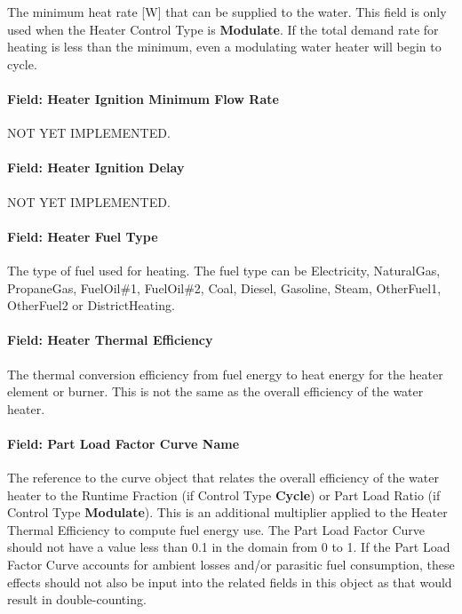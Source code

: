 The minimum heat rate {[}W{]} that can be supplied to the water. This field is only used when the Heater Control Type is \textbf{Modulate}. If the total demand rate for heating is less than the minimum, even a modulating water heater will begin to cycle.

\paragraph{Field: Heater Ignition Minimum Flow Rate}\label{field-heater-ignition-minimum-flow-rate}

NOT YET IMPLEMENTED.

\paragraph{Field: Heater Ignition Delay}\label{field-heater-ignition-delay}

NOT YET IMPLEMENTED.

\paragraph{Field: Heater Fuel Type}\label{field-heater-fuel-type}

The type of fuel used for heating. The fuel type can be Electricity, NaturalGas, PropaneGas, FuelOil\#1, FuelOil\#2, Coal, Diesel, Gasoline, Steam, OtherFuel1, OtherFuel2 or DistrictHeating.

\paragraph{Field: Heater Thermal Efficiency}\label{field-heater-thermal-efficiency}

The thermal conversion efficiency from fuel energy to heat energy for the heater element or burner. This is not the same as the overall efficiency of the water heater.

\paragraph{Field: Part Load Factor Curve Name}\label{field-part-load-factor-curve-name}

The reference to the curve object that relates the overall efficiency of the water heater to the Runtime Fraction (if Control Type \textbf{Cycle}) or Part Load Ratio (if Control Type \textbf{Modulate}). This is an additional multiplier applied to the Heater Thermal Efficiency to compute fuel energy use. The Part Load Factor Curve should not have a value less than 0.1 in the domain from 0 to 1. If the Part Load Factor Curve accounts for ambient losses and/or parasitic fuel consumption, these effects should not also be input into the related fields in this object as that would result in double-counting.

